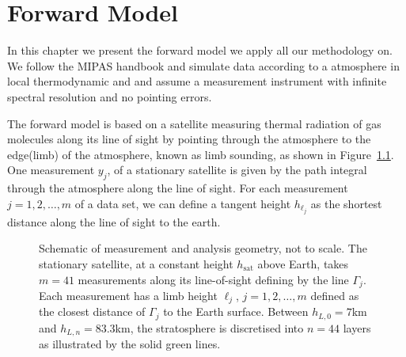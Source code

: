 \chapter{Forward Model}
\label{ch:formodel}
In this chapter we present the forward model we apply all our methodology on. We follow the MIPAS handbook \cite{mipas2000handbook} and simulate data according to a atmosphere in local thermodynamic and and assume a measurement instrument with infinite spectral resolution and no pointing errors.


The forward model is based on a satellite measuring thermal radiation of gas molecules along its line of sight by pointing through the atmosphere to the edge(limb) of the atmosphere, known as limb sounding, as shown in Figure~\ref{fig:LIMB}.
One measurement $y_j$, of a stationary satellite is given by the path integral through the atmosphere along the line of sight.
For each measurement $j=1,2,\ldots,m$ of a data set, we can define a tangent height $h_{\ell_j}$ as the shortest distance along the line of sight to the earth.
\begin{figure}[ht!]
	\centering
	
	\caption[Schematic of measurement and analysis geometry.]{Schematic of measurement and analysis geometry, not to scale.
		The stationary satellite, at a constant height $h_\text{sat}$ above Earth, takes $m = 41$ measurements along its line-of-sight defining by the line $\Gamma_j$.
		Each measurement has a limb height $\ell_j$, $j=1,2,\dots,m$ defined as the closest distance of $\Gamma_j$ to the Earth surface.
		Between $h_{L,0} = 7$km and $h_{L,n} = 83.3$km, the stratosphere is discretised into $n =44$ layers as illustrated by the solid green lines.}
		\label{fig:LIMB}
\end{figure}

